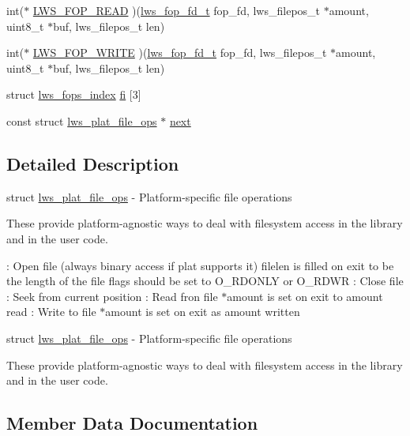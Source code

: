 \begin{DoxyCompactItemize}
\item 
int($\ast$ \hyperlink{structlws__plat__file__ops_aae5f22fbf335e6d4294b96c8b4e3b707}{L\+W\+S\+\_\+\+F\+O\+P\+\_\+\+R\+E\+AD} )(\hyperlink{structlws__fop__fd}{lws\+\_\+fop\+\_\+fd\+\_\+t} fop\+\_\+fd, lws\+\_\+filepos\+\_\+t $\ast$amount, uint8\+\_\+t $\ast$buf, lws\+\_\+filepos\+\_\+t len)
\item 
int($\ast$ \hyperlink{structlws__plat__file__ops_a745869c12377b44f51fd6a905031b255}{L\+W\+S\+\_\+\+F\+O\+P\+\_\+\+W\+R\+I\+TE} )(\hyperlink{structlws__fop__fd}{lws\+\_\+fop\+\_\+fd\+\_\+t} fop\+\_\+fd, lws\+\_\+filepos\+\_\+t $\ast$amount, uint8\+\_\+t $\ast$buf, lws\+\_\+filepos\+\_\+t len)
\item 
struct \hyperlink{structlws__fops__index}{lws\+\_\+fops\+\_\+index} \hyperlink{structlws__plat__file__ops_a1a9484f0e6c57b84d76bbbc1e68fc750}{fi} \mbox{[}3\mbox{]}
\item 
const struct \hyperlink{structlws__plat__file__ops}{lws\+\_\+plat\+\_\+file\+\_\+ops} $\ast$ \hyperlink{structlws__plat__file__ops_a43c884ea92f1b34ebf3cdaee6ca41aa1}{next}
\end{DoxyCompactItemize}


\subsection{Detailed Description}
struct \hyperlink{structlws__plat__file__ops}{lws\+\_\+plat\+\_\+file\+\_\+ops} -\/ Platform-\/specific file operations

These provide platform-\/agnostic ways to deal with filesystem access in the library and in the user code.

\+: Open file (always binary access if plat supports it) filelen is filled on exit to be the length of the file flags should be set to O\+\_\+\+R\+D\+O\+N\+LY or O\+\_\+\+R\+D\+WR \+: Close file \+: Seek from current position \+: Read fron file $\ast$amount is set on exit to amount read \+: Write to file $\ast$amount is set on exit as amount written

struct \hyperlink{structlws__plat__file__ops}{lws\+\_\+plat\+\_\+file\+\_\+ops} -\/ Platform-\/specific file operations

These provide platform-\/agnostic ways to deal with filesystem access in the library and in the user code. 

\subsection{Member Data Documentation}
\mbox{\label{structlws__plat__file__ops_ac6d1f0da750b68f23dd93a36aa32a3d7}} 
